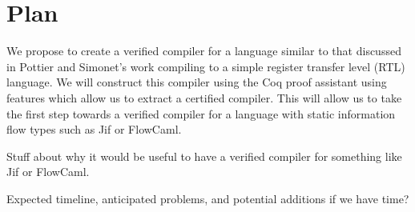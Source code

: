 \section{Plan}

We propose to create a verified compiler for a language similar to that
discussed in Pottier and Simonet's work\cite{InfoFlowML} compiling to a
simple register transfer level (RTL) language.  We will construct this
compiler using the Coq proof assistant\cite{coq?} using features which
allow us to extract a certified compiler.  This will allow us to take
the first step towards a verified compiler for a language with static
information flow types such as Jif\cite{myers1999jflow} or
FlowCaml\cite{simonet2003flow,simonet2003flowmanual}.

Stuff about why it would be useful to have a verified compiler for
something like Jif or FlowCaml.

Expected timeline, anticipated problems, and potential additions if we
have time?
